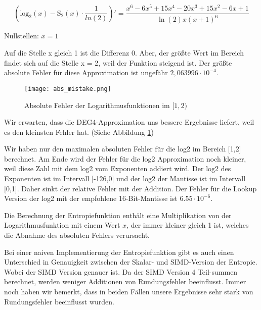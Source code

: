 \begin{equation*}
    (\mathrm{log_{2}}(x) - \mathrm{S_{2}}(x) \cdot \frac{1}{ln(2)})'
    = \dfrac{x^6-6x^5+15x^4-20x^3+15x^2-6x+1}{\ln\left(2\right)x\left(x+1\right)^6}
\end{equation*} \par

Nullstellen: $x = 1$ \par

Auf die Stelle x gleich 1 ist die Differenz 0. Aber, der größte Wert im Bereich findet sich auf die Stelle x = 2, weil der Funktion steigend ist. Der größte absolute Fehler für diese Approximation ist ungefähr $2,063996 \cdot 10^{-4}$.

\begin{figure}[h]
  \centering
  \texttt{[image: abs\_mistake.png]}
  \caption{Absolute Fehler der Logarithmusfunktionen im $[1,2)$}
    \label{fig:absolute-mistake}
\end{figure}

Wir erwarten, dass die DEG4-Approximation uns bessere Ergebnisse liefert, weil es den kleinsten Fehler hat. (Siehe Abbildung \ref{fig:absolute-mistake})

Wir haben nur den maximalen absoluten Fehler für die log2 im Bereich [1,2] berechnet. Am Ende wird der Fehler für die log2 Approximation noch kleiner, weil diese Zahl mit dem log2 vom Exponenten addiert wird. Der log2 des Exponenten ist im Intervall [-126,0] und der log2 der Mantisse ist im Intervall [0,1]. Daher sinkt der relative Fehler mit der Addition. Der Fehler für die Lookup Version der log2 mit der empfohlene 16-Bit-Mantisse ist $6.55 \cdot 10^{-6}$.~\cite{fast_log}


Die Berechnung der Entropiefunktion enthält eine Multiplikation von der Logarithmusfunktion mit einem Wert $x$, der immer kleiner gleich 1 ist, welches die Abnahme des absoluten Fehlers verursacht.

Bei einer naiven Implementierung der Entropiefunktion gibt es auch einen Unterschied in Genauigkeit zwischen der Skalar- und SIMD-Version der Entropie. Wobei der SIMD Version genauer ist. Da der SIMD Version 4 Teil-summen berechnet, werden weniger Additionen von Rundungsfehler beeinflusst. Immer noch haben wir bemerkt, dass in beiden Fällen unsere Ergebnisse sehr stark von Rundungsfehler beeinflusst wurden.

